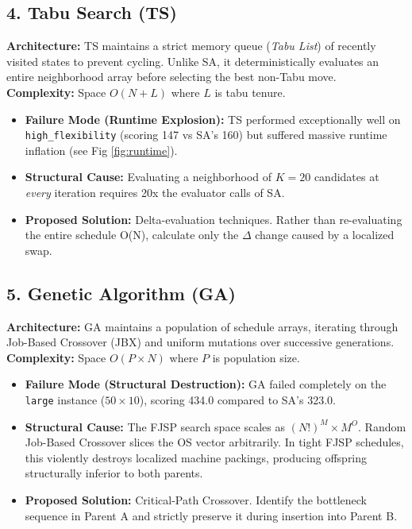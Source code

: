 \documentclass[11pt,a4paper]{article}
\begin{document}
\subsection{4. Tabu Search (TS)}
\textbf{Architecture:} TS maintains a strict memory queue (\textit{Tabu List}) of recently visited states to prevent cycling. Unlike SA, it deterministically evaluates an entire neighborhood array before selecting the best non-Tabu move. \\
\textbf{Complexity:} Space $O(N + L)$ where $L$ is tabu tenure.
\begin{itemize}
    \item \textbf{Failure Mode (Runtime Explosion):} TS performed exceptionally well on \texttt{high\_flexibility} (scoring 147 vs SA's 160) but suffered massive runtime inflation (see Fig \ref{fig:runtime}).
    \item \textbf{Structural Cause:} Evaluating a neighborhood of $K=20$ candidates at \textit{every} iteration requires 20x the evaluator calls of SA.
    \item \textbf{Proposed Solution:} Delta-evaluation techniques. Rather than re-evaluating the entire schedule O(N), calculate only the $\Delta$ change caused by a localized swap.
\end{itemize}

\subsection{5. Genetic Algorithm (GA)}
\textbf{Architecture:} GA maintains a population of schedule arrays, iterating through Job-Based Crossover (JBX) and uniform mutations over successive generations. \\
\textbf{Complexity:} Space $O(P \times N)$ where $P$ is population size.
\begin{itemize}
    \item \textbf{Failure Mode (Structural Destruction):} GA failed completely on the \texttt{large} instance ($50 \times 10$), scoring 434.0 compared to SA's 323.0.
    \item \textbf{Structural Cause:} The FJSP search space scales as $(N!)^M \times M^O$. Random Job-Based Crossover slices the OS vector arbitrarily. In tight FJSP schedules, this violently destroys localized machine packings, producing offspring structurally inferior to both parents.
    \item \textbf{Proposed Solution:} Critical-Path Crossover. Identify the bottleneck sequence in Parent A and strictly preserve it during insertion into Parent B.
\end{itemize}
\end{document}
